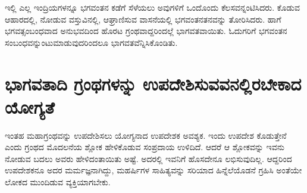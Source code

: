 ಇಲ್ಲಿ ಎಲ್ಲ ಇಂದ್ರಿಯಗಳನ್ನೂ ಭಗವಂತನ ಕಡೆಗೆ ಸೆಳೆಯಲು ಅವುಗಳಿಗೆ ಒಂದೊಂದು ಕೆಲಸವನ್ನಂಟಿಸಿದರು. ಕೊಡುವ ಆಹಾರದಲ್ಲಿ, ನೋಡುವ ವಸ್ತುವಿನಲ್ಲಿ, ಆಘ್ರಾಣಿಸುವ ವಾಸನೆಯಲ್ಲಿ ಭಗವಂತನತನವನ್ನು ತೋರಿಸಿದರು. ಹಾಗೆ ಭಗವತ್ಸಂಬಂಧವಾದ ಅನುಭವದಿಂದ ಹೊರಟ ಗ್ರಂಥವಾದ್ದರಿಂದಲ್ಲೆ ಭಾಗವತವಾಯಿತು. ಓದುಗರಿಗೆ ಭಗವಂತನ ಸಂಬಂಧವನ್ನುಂಟುಮಾಡುವುದರಿಂದಲೂ ಭಾಗವತವೆನ್ನಿಸಿಕೊಂಡಿತು.

\section*{ಭಾಗವತಾದಿ ಗ್ರಂಥಗಳನ್ನು ಉಪದೇಶಿಸುವವನಲ್ಲಿರಬೇಕಾದ ಯೋಗ್ಯತೆ}

ಇಂತಹ ಮಹಾಗ್ರಂಥವನ್ನು ಉಪದೇಶಿಸಲು ಯೋಗ್ಯನಾದ ಉಪದೇಶಕ ಅವಶ್ಯಕ. ಇಂದು ಉಪದೇಶ ಕೊಡುತ್ತೇನೆ ಎಂದು ಗ್ರಂಥದ ಮೊದಲನೆಯ ಶ್ಲೋಕ ಹೇಳಿಕೊಡುವ ಸಂಪ್ರದಾಯ ಉಳಿದಿದೆ. ಆದರೆ ಆ ಶ್ಲೋಕವನ್ನು ಇವನು ನೋಡುವ ಬದಲು ಅವರು ಹೇಳಿದಂತಾಯಿತು ಅಷ್ಟೆ. ಅದರಲ್ಲಿ ಇವನಿಗೆ ಹೊಸದೇನೂ ಲಭಿಸುವುದಿಲ್ಲ. ಆದ್ದರಿಂದ ಉಪದೇಶಕನೂ ಅದರ ಮರ್ಮಜ್ಞನಾಗಿದ್ದು, ಮಹರ್ಷಿಗಳ ಸಾಹಿತ್ಯವನ್ನು ಸರಿಯಾದ ಹಿನ್ನೆಲೆಯೊಡನೆ ಗ್ರಹಿಸಿ ಅಂತೆಯೇ ಲೋಕದ ಮುಂದಿಡುವ ವ್ಯಕ್ತಿಯಾಗಬೇಕು.
